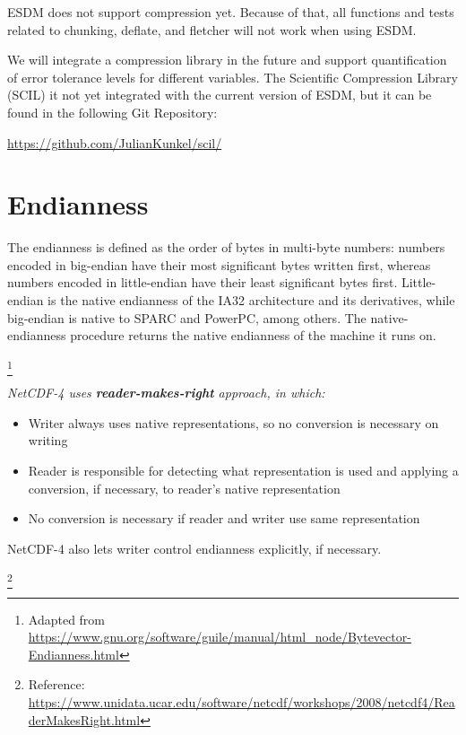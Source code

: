 ESDM does not support compression yet.
Because of that, all functions and tests related to chunking, deflate, and fletcher will not work when using ESDM.

We will integrate a compression library in the future and support quantification of error tolerance levels for different variables.
The Scientific Compression Library (SCIL) it not yet integrated with the current version of ESDM, but it can be found in the following Git Repository:

\begin{center}
\url{https://github.com/JulianKunkel/scil/}
\end{center}

\section{Endianness}

{\itshape

The endianness is defined as the order of bytes in multi-byte numbers: numbers encoded in big-endian have their most significant bytes written first, whereas numbers encoded in little-endian have their least significant bytes first. Little-endian is the native endianness of the IA32 architecture and its derivatives, while big-endian is native to SPARC and PowerPC, among others. The native-endianness procedure returns the native endianness of the machine it runs on.
}\footnote{Adapted from \url{https://www.gnu.org/software/guile/manual/html_node/Bytevector-Endianness.html}}

{\itshape
NetCDF-4 uses \textbf{reader-makes-right} approach, in which:

\begin{itemize}

\item Writer always uses native representations, so no conversion is necessary on writing

\item Reader is responsible for detecting what representation is used and applying a conversion, if necessary, to reader's native representation

\item No conversion is necessary if reader and writer use same representation

\end{itemize}

NetCDF-4 also lets writer control endianness explicitly, if necessary.
}\footnote{Reference: \url{https://www.unidata.ucar.edu/software/netcdf/workshops/2008/netcdf4/ReaderMakesRight.html}}

